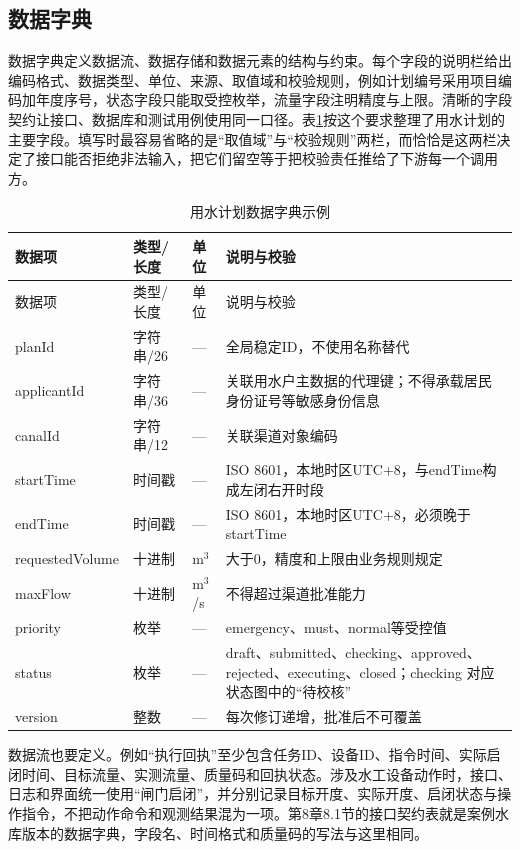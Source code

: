 \subsection{数据字典}

数据字典定义数据流、数据存储和数据元素的结构与约束。每个字段的说明栏给出编码格式、数据类型、单位、来源、取值域和校验规则，例如计划编号采用项目编码加年度序号，状态字段只能取受控枚举，流量字段注明精度与上限。清晰的字段契约让接口、数据库和测试用例使用同一口径。表\ref{tab:water-plan-dictionary}按这个要求整理了用水计划的主要字段。填写时最容易省略的是“取值域”与“校验规则”两栏，而恰恰是这两栏决定了接口能否拒绝非法输入，把它们留空等于把校验责任推给了下游每一个调用方。

\begin{longtable}{p{3.4cm}p{2.0cm}p{1.7cm}p{4.3cm}}
\caption{用水计划数据字典示例}\label{tab:water-plan-dictionary}\\
\toprule
数据项 & 类型/长度 & 单位 & 说明与校验 \\
\midrule
\endfirsthead
\toprule
数据项 & 类型/长度 & 单位 & 说明与校验 \\
\midrule
\endhead
planId & 字符串/26 & — & 全局稳定ID，不使用名称替代 \\
applicantId & 字符串/36 & — & 关联用水户主数据的代理键；不得承载居民身份证号等敏感身份信息 \\
canalId & 字符串/12 & — & 关联渠道对象编码 \\
startTime & 时间戳 & — & ISO 8601，本地时区UTC+8，与endTime构成左闭右开时段 \\
endTime & 时间戳 & — & ISO 8601，本地时区UTC+8，必须晚于startTime \\
requestedVolume & 十进制 & m$^3$ & 大于0，精度和上限由业务规则规定 \\
maxFlow & 十进制 & m$^3$/s & 不得超过渠道批准能力 \\
priority & 枚举 & — & emergency、must、normal等受控值 \\
status & 枚举 & — & draft、submitted、checking、approved、rejected、executing、closed；checking 对应状态图中的“待校核” \\
version & 整数 & — & 每次修订递增，批准后不可覆盖 \\
\bottomrule
\end{longtable}

数据流也要定义。例如“执行回执”至少包含任务ID、设备ID、指令时间、实际启闭时间、目标流量、实测流量、质量码和回执状态。涉及水工设备动作时，接口、日志和界面统一使用“闸门启闭”，并分别记录目标开度、实际开度、启闭状态与操作指令，不把动作命令和观测结果混为一项。第8章8.1节的接口契约表就是案例水库版本的数据字典，字段名、时间格式和质量码的写法与这里相同。

